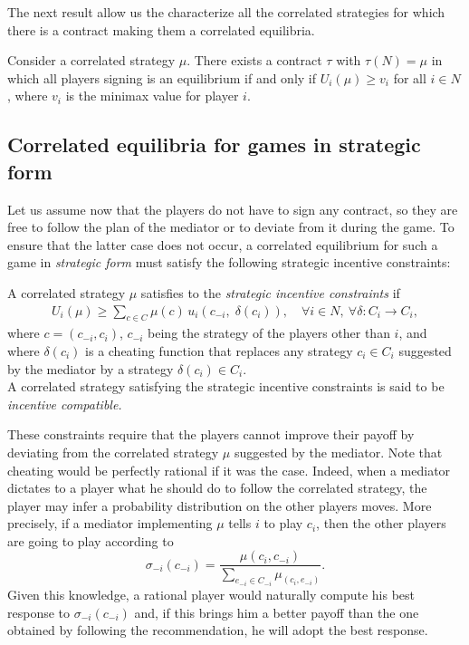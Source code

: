 The next result allow us the characterize all the correlated strategies for which there is a contract making them a correlated equilibria.
\begin{theorem}
Consider a correlated strategy $\mu$. There exists a contract $\tau$ with $\tau(N) = \mu$ in which all players signing is an equilibrium if and only if $U_i(\mu) \geq v_i$ for all $i \in N$, where $v_i$ is the minimax value for player $i$.
\label{thm:minimaxcor}
\end{theorem}

\vspace{1cm}


\subsection{Correlated equilibria for games in strategic form}
\label{ch5:sec:cor}



Let us assume now that the players do not have to sign any contract, so they are free to follow the plan of the mediator or to deviate from it during the game. To ensure that the latter case does not occur, a correlated equilibrium for such a game in \emph{strategic form} must satisfy the following strategic incentive constraints:
\begin{definition}
A correlated strategy $\mu$ satisfies to the \emph{strategic incentive constraints} if
\begin{align*}
	U_i(\mu) \geq \sum_{c \in C} \mu(c) \, u_i(c_{-i}, \; \delta(c_i)), \quad \forall i \in N, \ \forall \delta : C_i \rightarrow C_i,
\end{align*}
where $c = (c_{-i}, c_i)$, $c_{-i}$ being the strategy of the players other than $i$, and where $\delta(c_i)$ is a cheating function that replaces any strategy $c_i \in C_i$ suggested by the mediator by a strategy $\delta(c_i) \in C_i$. \\
A correlated strategy satisfying the strategic incentive constraints is said to be \emph{incentive compatible.}
\label{ch6:def:incentive}
\end{definition}


These constraints require that the players cannot improve their payoff by deviating from the correlated strategy $\mu$ suggested by the mediator. Note that cheating would be perfectly rational if it was the case.
Indeed, when a mediator dictates to a player what he should do to follow the correlated strategy, the player may infer a probability distribution on the other players moves.
More precisely, if a mediator implementing $\mu$ tells $i$ to play $c_i$, then the other players are going to play according to
$$ \sigma_{-i}(c_{-i}) = \frac{\mu(c_{i}, c_{-i})}{ \sum_{e_{-i} \in C_{-i}} \mu_(c_i, e_{-i})}.$$
Given this knowledge, a rational player would naturally compute his best response to $\sigma_{-i}(c_{-i})$ and, if this brings him a better payoff than the one obtained by following the recommendation, he will adopt the best response.

